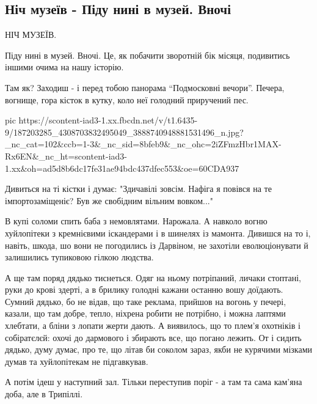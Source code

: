  
 
 
 
 
\subsection{Ніч музеїв - Піду нині в музей. Вночі}
\label{sec:18_05_2021.fb.nicoj_larisa.1.nich_muzeiv}

НІЧ МУЗЕЇВ.

Піду нині в музей. Вночі. Це, як побачити зворотній бік місяця, подивитись
іншими очима на нашу історію. 

Там як? Заходиш - і перед тобою панорама \enquote{Подмосковні вечори}. Печера,
вогнище, гора кісток в кутку, коло неї голодний приручений пес. 

\ifcmt
  pic https://scontent-iad3-1.xx.fbcdn.net/v/t1.6435-9/187203285_4308703832495049_3888740948881531496_n.jpg?_nc_cat=102&ccb=1-3&_nc_sid=8bfeb9&_nc_ohc=2iZFmzHbr1MAX-Rx6EN&_nc_ht=scontent-iad3-1.xx&oh=ad5d8b6dc17fe31ae94bdc437dfec553&oe=60CDA937
\fi


Дивиться на ті кістки і думає: "Здичавілі зовсім. Нафіга я повівся на те імпортозаміщеніє? Був же свобідним вільним вовком..." 

В купі соломи спить баба з немовлятами. Нарожала.  А навколо вогню хуйлопітеки
з кремнієвими іскандерами і в шинелях із мамонта. Дивишся на то і, навіть,
шкода, шо вони не погодились із Дарвіном, не захотіли еволюціонувати й
залишились тупиковою гілкою людства.

А ще там поряд дядько тиснеться. Одяг на ньому потріпаний, личаки стоптані,
руки до крові здерті, а в брилику голодні кажани останню вошу доїдають. Сумний
дядько, бо не відав, що таке реклама, прийшов на вогонь у печері, казали, що
там добре, тепло, ніхрена робити не потрібно, і можна лаптями хлебтати, а бліни
з лопати жерти дають. А виявилось, що то плем'я охотніків і собіратєлєй: охочі
до дармового і збирають все, що погано лежить. От і сидить дядько, думу думає,
про те, що літав би соколом зараз, якби не курячими мізками думав та
хуйлопітекам не підгавкував. 

А потім ідеш у наступний зал. Тільки переступив поріг - а там та сама кам'яна доба, але в Трипіллі.

